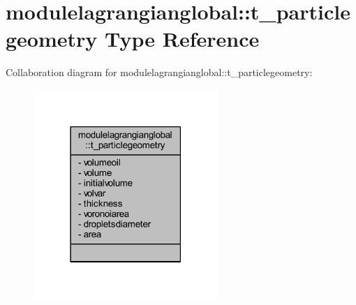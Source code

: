 \hypertarget{structmodulelagrangianglobal_1_1t__particlegeometry}{}\section{modulelagrangianglobal\+:\+:t\+\_\+particlegeometry Type Reference}
\label{structmodulelagrangianglobal_1_1t__particlegeometry}


Collaboration diagram for modulelagrangianglobal\+:\+:t\+\_\+particlegeometry\+:\nopagebreak
\begin{figure}[H]
\begin{center}
\leavevmode
\includegraphics[width=198pt]{structmodulelagrangianglobal_1_1t__particlegeometry__coll__graph}
\end{center}
\end{figure}

